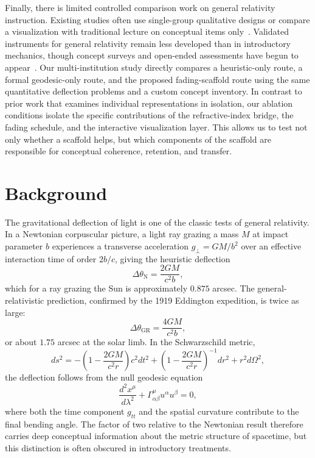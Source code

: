 \documentclass{article}
\begin{document}
Finally, there is limited controlled comparison work on general relativity instruction. Existing studies often use single-group qualitative designs or compare a visualization with traditional lecture on conceptual items only~\cite{Kohnle2013,Zahn2020,Hoehn2018}. Validated instruments for general relativity remain less developed than in introductory mechanics, though concept surveys and open-ended assessments have begun to appear~\cite{Baily2017,McColgan2012}. Our multi-institution study directly compares a heuristic-only route, a formal geodesic-only route, and the proposed fading-scaffold route using the same quantitative deflection problems and a custom concept inventory. In contrast to prior work that examines individual representations in isolation, our ablation conditions isolate the specific contributions of the refractive-index bridge, the fading schedule, and the interactive visualization layer. This allows us to test not only whether a scaffold helps, but which components of the scaffold are responsible for conceptual coherence, retention, and transfer.

\section{Background}
\label{sec:background}

The gravitational deflection of light is one of the classic tests of general relativity. In a Newtonian corpuscular picture, a light ray grazing a mass \(M\) at impact parameter \(b\) experiences a transverse acceleration \(g_\perp = GM/b^2\) over an effective interaction time of order \(2b/c\), giving the heuristic deflection
\begin{equation}
\Delta\theta_{\mathrm{N}} = \frac{2GM}{c^2 b},
\end{equation}
which for a ray grazing the Sun is approximately \(0.875\) arcsec. The general-relativistic prediction, confirmed by the 1919 Eddington expedition, is twice as large:
\begin{equation}
\Delta\theta_{\mathrm{GR}} = \frac{4GM}{c^2 b},
\end{equation}
or about \(1.75\) arcsec at the solar limb. In the Schwarzschild metric,
\begin{equation}
ds^2 = -\left(1-\frac{2GM}{c^2 r}\right)c^2 dt^2 + \left(1-\frac{2GM}{c^2 r}\right)^{-1} dr^2 + r^2 d\Omega^2,
\end{equation}
the deflection follows from the null geodesic equation
\begin{equation}
\frac{d^2 x^\mu}{d\lambda^2} + \Gamma^\mu_{\alpha\beta} u^\alpha u^\beta = 0,
\end{equation}
where both the time component \(g_{tt}\) and the spatial curvature contribute to the final bending angle. The factor of two relative to the Newtonian result therefore carries deep conceptual information about the metric structure of spacetime, but this distinction is often obscured in introductory treatments.
\end{document}
